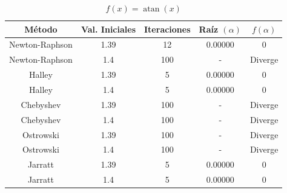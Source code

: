 \begin{table}[H]
\centering

\renewcommand{\arraystretch}{1.3} %
\setlength{\tabcolsep}{12pt}      %

\begin{tabular}{ccccc}
\hline
Método & Val. Iniciales & Iteraciones & Raíz $(\alpha)$ & $f(\alpha)$ \\
\hline

Newton-Raphson & 1.39 &  12 & 0.00000 & 0                    \\

Newton-Raphson & 1.4  & 100 & -       & Diverge              \\

Halley         & 1.39 &   5 & 0.00000 & 0                    \\

Halley         & 1.4  &   5 & 0.00000 & 0                    \\

Chebyshev      & 1.39 & 100 & -       & Diverge              \\

Chebyshev      & 1.4  & 100 & -       & Diverge              \\

Ostrowski      & 1.39 & 100 & -       & Diverge              \\

Ostrowski      & 1.4  & 100 & -       & Diverge              \\

Jarratt        & 1.39 &   5 & 0.00000 & 0                    \\

Jarratt        & 1.4  &   5 & 0.00000 & 0                    \\

\hline
\end{tabular}

\caption{$f(x) = \operatorname{atan}{\left(x \right)}$}
\end{table}


